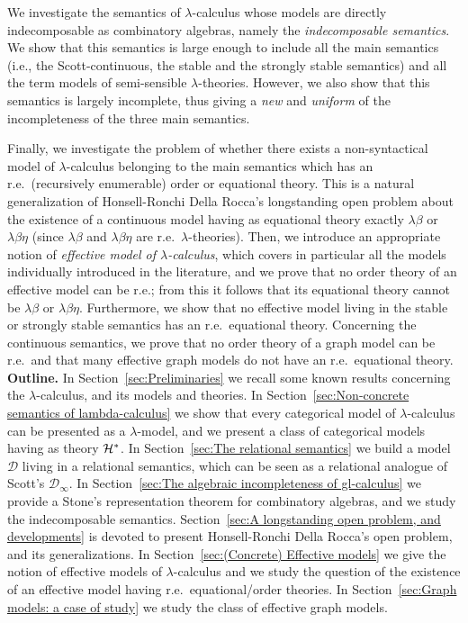 \documentclass[english]{llncs}
\newcommand{\lm}[1]{\mathscr{#1}} \newcommand{\Lint}[1]{\Lbrack #1\Rbrack} \newcommand{\ca}[1]{\mathscr{#1}} \newcommand{\Int}[1]{\vert #1\vert}
\newcommand{\cH}{{\cal H}}
\begin{document}
We investigate the semantics of $\lambda$-calculus whose models are directly indecomposable as combinatory algebras, namely the {\em indecomposable semantics}. We show that 
this semantics is large enough to include all the main semantics (i.e., the Scott-continuous, the stable and the strongly stable semantics) and all the term models of semi-sensible $\lambda$-theories. However, we also show that this semantics is largely incomplete, thus giving a {\em new} and {\em uniform} of the incompleteness of the three main semantics.

Finally, we investigate the problem of whether there exists a non-syntactical model of $\lambda$-calculus belonging to the main semantics which has an r.e.\ 
(recursively enumerable) order or equational theory. 
This is a natural generalization of Honsell-Ronchi Della Rocca's longstanding open problem about the existence of a continuous model having as equational theory exactly $\lambda\beta$ or 
$\lambda\beta\eta$ (since $\lambda\beta$ and $\lambda\beta\eta$ are r.e.\ $\lambda$-theories). 
Then, we introduce an appropriate notion of {\em effective model of $\lambda$-calculus}, which covers in particular all the models individually introduced in the literature,
and we prove that no order theory of an effective model can be r.e.; from this it follows that its equational theory cannot be $\lambda\beta$ or $\lambda\beta\eta$.
Furthermore, we show that no effective model living in the stable or strongly stable semantics has an r.e.\ equational theory.
Concerning the continuous semantics, we prove that no order theory of a graph model can be r.e.\ and that many effective graph models do not have an r.e.\ equational theory.\\

{\bf Outline.} In Section~\ref{sec:Preliminaries} we recall some known results concerning the $\lambda$-calculus, and its models and theories.
In Section~\ref{sec:Non-concrete semantics of lambda-calculus} we show that every categorical model of $\lambda$-calculus can be presented as a $\lambda$-model,
and we present a class of categorical models having as theory $\cH^*$.
In Section~\ref{sec:The relational semantics} we build a model $\lm{D}$ living in a relational semantics,
which can be seen as a relational analogue of Scott's $\lm{D}_\infty$.
In Section~\ref{sec:The algebraic incompleteness of gl-calculus} we provide a Stone's representation theorem for combinatory algebras, 
and we study the indecomposable semantics.
Section~\ref{sec:A longstanding open problem, and developments} is devoted to present Honsell-Ronchi Della Rocca's open problem,
and its generalizations.
In Section~\ref{sec:(Concrete) Effective models} we give the notion of effective models of $\lambda$-calculus and 
we study the question of the existence of an effective model having r.e.\ equational/order theories.
In Section~\ref{sec:Graph models: a case of study} we study the class of effective graph models.
\end{document}
